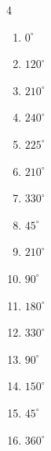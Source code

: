 \begin{multicols}{4}
\begin{enumerate}
  \item $\displaystyle 0^{\circ}$
        \phantom{$\displaystyle =0$}

  \item $\displaystyle 120^{\circ}$

  \item $\displaystyle 210^{\circ}$

  \item $\displaystyle 240^{\circ}$

  \item $\displaystyle 225^{\circ}$

  \item $\displaystyle 210^{\circ}$

  \item $\displaystyle 330^{\circ}$

  \item $\displaystyle 45^{\circ}$

  \item $\displaystyle 210^{\circ}$

  \item $\displaystyle 90^{\circ}$

  \item $\displaystyle 180^{\circ}$
        \phantom{$\displaystyle =\pi$}

  \item $\displaystyle 330^{\circ}$

\columnbreak %

  \item $\displaystyle 90^{\circ}$

  \item $\displaystyle 150^{\circ}$

  \item $\displaystyle 45^{\circ}$

  \item $\displaystyle 360^{\circ}$
        \phantom{$\displaystyle =2\pi$}


\end{enumerate}
\end{multicols}
